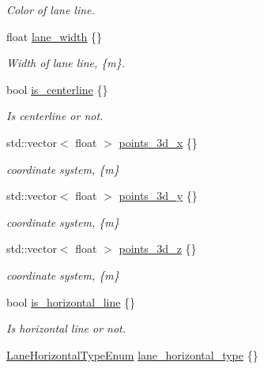 \begin{DoxyCompactItemize}
\begin{DoxyCompactList}\small\item\em Color of lane line. \end{DoxyCompactList}\item 
float \hyperlink{structmaf__perception__interface_1_1Lane_a53918522acbdce5008149b0d262250b2}{lane\+\_\+width} \{\}
\begin{DoxyCompactList}\small\item\em Width of lane line, \{m\}. \end{DoxyCompactList}\item 
bool \hyperlink{structmaf__perception__interface_1_1Lane_aa2886e6ed7a4ce23cc1c06fc4380869a}{is\+\_\+centerline} \{\}
\begin{DoxyCompactList}\small\item\em Is centerline or not. \end{DoxyCompactList}\item 
std\+::vector$<$ float $>$ \hyperlink{structmaf__perception__interface_1_1Lane_a2224e219a5c604a64244ec3718fbe3b3}{points\+\_\+3d\+\_\+x} \{\}
\begin{DoxyCompactList}\small\item\em coordinate system, \{m\} \end{DoxyCompactList}\item 
std\+::vector$<$ float $>$ \hyperlink{structmaf__perception__interface_1_1Lane_af124028511b65e931dfa9199c075e9b6}{points\+\_\+3d\+\_\+y} \{\}
\begin{DoxyCompactList}\small\item\em coordinate system, \{m\} \end{DoxyCompactList}\item 
std\+::vector$<$ float $>$ \hyperlink{structmaf__perception__interface_1_1Lane_a12ec89a23e5812e0db23f75790c6135d}{points\+\_\+3d\+\_\+z} \{\}
\begin{DoxyCompactList}\small\item\em coordinate system, \{m\} \end{DoxyCompactList}\item 
bool \hyperlink{structmaf__perception__interface_1_1Lane_a1b45d6ce8931a9cd79c9c1fcc7c24cff}{is\+\_\+horizontal\+\_\+line} \{\}
\begin{DoxyCompactList}\small\item\em Is horizontal line or not. \end{DoxyCompactList}\item 
\hyperlink{structmaf__perception__interface_1_1LaneHorizontalTypeEnum}{Lane\+Horizontal\+Type\+Enum} \hyperlink{structmaf__perception__interface_1_1Lane_a41595cf48743242cdf5087c098114831}{lane\+\_\+horizontal\+\_\+type} \{\}

\end{DoxyCompactItemize}
